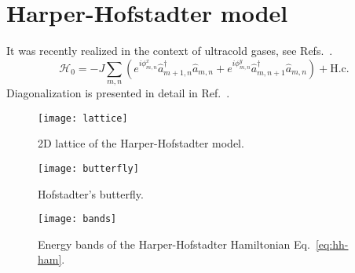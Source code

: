\section{Harper-Hofstadter model}
\label{sec:hh-atoms}
It was recently realized in the context of ultracold gases, see
Refs.~\cite{aidelsburger2013hh,miyake2013hh}.
%
\begin{equation}\label{eq:hh-ham}
  \mathcal{H}_0 = -J\sum_{m,n}(e^{i
    \phi_{m,n}^x}\hat{a}_{m+1,n}^{\dagger}\hat{a}_{m,n} +e^{i
    \phi_{m,n}^y}\hat{a}_{m,n+1}^{\dagger}\hat{a}_{m,n}) + \text{H.c.}
\end{equation}
% 
Diagonalization is presented in detail in
Ref.~\cite{jain2007composite}.
%
\begin{figure}[tb]\centering
  \texttt{[image: lattice]}
  \caption{
    2D lattice of the Harper-Hofstadter model.
  }\label{fig:hh-lattice}
\end{figure}
% 
%
\begin{figure}[tb]\centering
  \texttt{[image: butterfly]}
  \caption{
    Hofstadter's butterfly. %
  }\label{fig:butterfly}
\end{figure}
% 
%
\begin{figure}[tb]\centering
  \texttt{[image: bands]}
  \caption{
    Energy bands of the Harper-Hofstadter Hamiltonian Eq.~\eqref{eq:hh-ham}.
  }\label{fig:hh-energy-levels}
\end{figure}
% 


